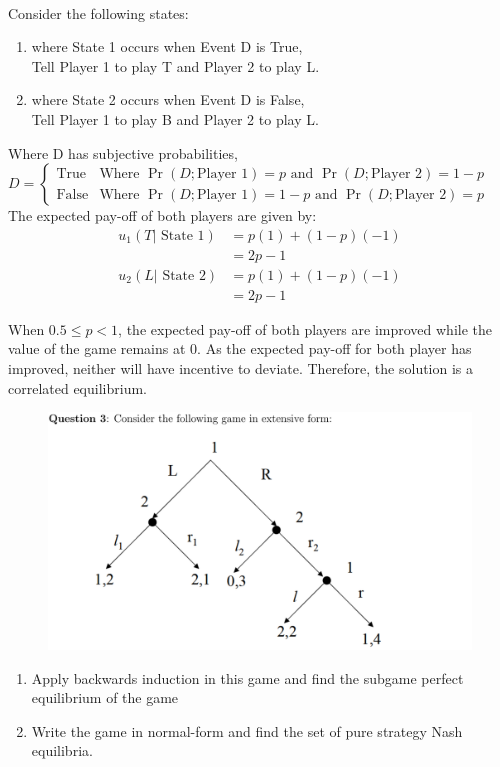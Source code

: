 \documentclass[12pt]{article}
\newenvironment{solution}[2][Solution]{\begin{trivlist}
\item[\hskip \labelsep {\bfseries #1}]}{\end{trivlist}}
\begin{document}
\begin{solution}{}~\\

Consider the following states:\begin{enumerate}
\item[\textbf{State 1:}] where State 1 occurs when Event D is True,\\
Tell Player 1 to play T and Player 2 to play L.
\item[\textbf{State 2:}] where State 2 occurs when Event D is False,\\
Tell Player 1 to play B and Player 2 to play L.
\end{enumerate}
Where D has subjective probabilities,\\

$D=\left\{\begin{array}{ll}
\text{True} & \text{Where }\Pr(D;\text{Player 1})=p\text{ and }\Pr(D;\text{Player 2})=1-p\\
\text{False} & \text{Where }\Pr(D;\text{Player 1})=1-p\text{ and }\Pr(D;\text{Player 2})=p
\end{array}\right.$\\

The expected pay-off of both players are given by:
\begin{align*}
u_1(T|\text{ State 1})&=p(1)+(1-p)(-1)\\
&=2p-1\\
u_2(L|\text{ State 2})&=p(1)+(1-p)(-1)\\
&=2p-1
\end{align*}
\begin{center}
When $0.5\leq p<1$, the expected pay-off of both players are improved while the value of the game remains at 0. As the expected pay-off for both player has improved, neither will have incentive to deviate. Therefore, the solution is a correlated equilibrium.
\end{center}
\end{solution}
\pagebreak
\begin{figure}[h!]
\includegraphics[width=\linewidth]{./assets/201806021726.png}
\end{figure}
\begin{enumerate}[label=(\alph*)]
\item Apply backwards induction in this game and find the subgame perfect equilibrium of the game
\item Write the game in normal-form and find the set of pure strategy Nash equilibria.
\end{enumerate}
\end{document}
